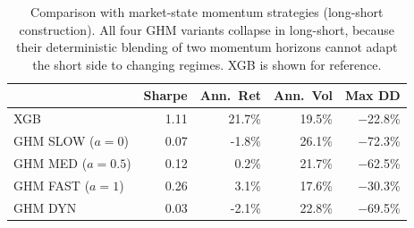 \begin{table}[H]
\centering
\small
\begin{tabular}{l r r r r}
\toprule
 & Sharpe & Ann.\ Ret & Ann.\ Vol & Max DD \\
\midrule
XGB & 1.11 & 21.7\% & 19.5\% & $-$22.8\% \\
\midrule
GHM SLOW ($a=0$) & 0.07 & -1.8\% & 26.1\% & $-$72.3\% \\
GHM MED ($a=0.5$) & 0.12 & 0.2\% & 21.7\% & $-$62.5\% \\
GHM FAST ($a=1$) & 0.26 & 3.1\% & 17.6\% & $-$30.3\% \\
GHM DYN & 0.03 & -2.1\% & 22.8\% & $-$69.5\% \\
\bottomrule
\end{tabular}
\caption{Comparison with \citet{GHM2023} market-state momentum strategies (long-short construction). All four GHM variants collapse in long-short, because their deterministic blending of two momentum horizons cannot adapt the short side to changing regimes. XGB is shown for reference.}
\label{tab:ghm_comparison}
\end{table}